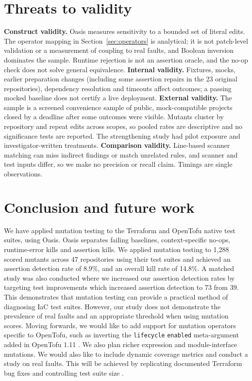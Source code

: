\documentclass[3p,times,procedia]{elsarticle}
\newcommand{\code}[1]{\texttt{#1}}
\begin{document}
\section{Threats to validity}\label{sec:threats}\label{sec:discussion}
\textbf{Construct validity.} Oasis measures sensitivity to a bounded set of literal edits. The operator mapping in Section~\ref{sec:operators} is analytical; it is not patch-level validation or a measurement of coupling to real faults, and Boolean inversion dominates the sample. Runtime rejection is not an assertion oracle, and the no-op check does not solve general equivalence. \textbf{Internal validity.} Fixtures, mocks, earlier preparation changes (including some assertion repairs in the 23 original repositories), dependency resolution and timeouts affect outcomes; a passing mocked baseline does not certify a live deployment. \textbf{External validity.} The sample is a screened convenience sample of public, mock-compatible projects closed by a deadline after some outcomes were visible. Mutants cluster by repository and repeat edits across scopes, so pooled rates are descriptive and no significance tests are reported. The strengthening study had pilot exposure and investigator-written treatments. \textbf{Comparison validity.} Line-based scanner matching can miss indirect findings or match unrelated rules, and scanner and test inputs differ, so we make no precision or recall claim. Timings are single observations.

\section{Conclusion and future work}\label{sec:conclusion}\label{sec:repro}
We have applied mutation testing to the Terraform and OpenTofu native test suites, using Oasis. Oasis separates failing baselines, context-specific no-ops, runtime-error kills and assertion kills. We applied mutation testing to 1,288 scored mutants across 47 repositories using their test suites and achieved an assertion detection rate of 8.9\%, and an overall kill rate of 14.8\%. A matched study was also conducted where we increased our assertion detection rates by targeting test improvements which increased assertion detection to 73 from 39. This demonstrates that mutation testing can provide a practical method of diagnosing IaC test suites. However, our study does not demonstrate the prevalence of real faults and an appropriate threshold when using mutation scores. Moving forwards, we would like to add support for mutation operators specific to OpenTofu, such as inverting the \code{lifecycle} \code{enabled} meta-argument added in OpenTofu 1.11
\cite{tofuenabled}. We also plan richer expression and module-interface mutations. We would also like to include dynamic coverage metrics and conduct a study on real faults. This will be achieved by replicating documented Terraform bug fixes and controlling test suite size 
\cite{just,papadakis2018}.
\end{document}
